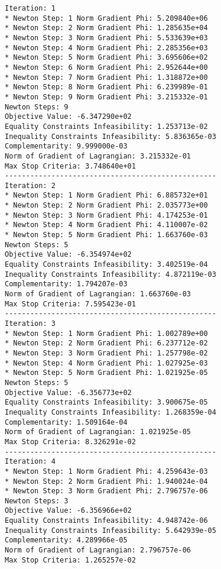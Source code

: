 \documentclass{article}
\begin{document}
\scriptsize
\begin{minipage}[t]{0.45\textwidth}
\begin{verbatim}
Iteration: 1
* Newton Step: 1 Norm Gradient Phi: 5.209840e+06
* Newton Step: 2 Norm Gradient Phi: 1.285635e+04
* Newton Step: 3 Norm Gradient Phi: 5.533639e+03
* Newton Step: 4 Norm Gradient Phi: 2.285356e+03
* Newton Step: 5 Norm Gradient Phi: 3.695606e+02
* Newton Step: 6 Norm Gradient Phi: 2.952644e+00
* Newton Step: 7 Norm Gradient Phi: 1.318872e+00
* Newton Step: 8 Norm Gradient Phi: 6.239989e-01
* Newton Step: 9 Norm Gradient Phi: 3.215332e-01
Newton Steps: 9
Objective Value: -6.347290e+02
Equality Constraints Infeasibility: 1.253713e-02
Inequality Constraints Infeasibility: 5.836365e-03
Complementarity: 9.999000e-03
Norm of Gradient of Lagrangian: 3.215332e-01
Max Stop Criteria: 3.748640e+01
--------------------------------------------------
Iteration: 2
* Newton Step: 1 Norm Gradient Phi: 6.885732e+01
* Newton Step: 2 Norm Gradient Phi: 2.035773e+00
* Newton Step: 3 Norm Gradient Phi: 4.174253e-01
* Newton Step: 4 Norm Gradient Phi: 4.110007e-02
* Newton Step: 5 Norm Gradient Phi: 1.663760e-03
Newton Steps: 5
Objective Value: -6.354974e+02
Equality Constraints Infeasibility: 3.402519e-04
Inequality Constraints Infeasibility: 4.872119e-03
Complementarity: 1.794207e-03
Norm of Gradient of Lagrangian: 1.663760e-03
Max Stop Criteria: 7.595423e-01
--------------------------------------------------
Iteration: 3
* Newton Step: 1 Norm Gradient Phi: 1.002789e+00
* Newton Step: 2 Norm Gradient Phi: 6.237712e-02
* Newton Step: 3 Norm Gradient Phi: 1.257798e-02
* Newton Step: 4 Norm Gradient Phi: 1.027925e-03
* Newton Step: 5 Norm Gradient Phi: 1.021925e-05
Newton Steps: 5
Objective Value: -6.356773e+02
Equality Constraints Infeasibility: 3.900675e-05
Inequality Constraints Infeasibility: 1.268359e-04
Complementarity: 1.509164e-04
Norm of Gradient of Lagrangian: 1.021925e-05
Max Stop Criteria: 8.326291e-02
--------------------------------------------------
Iteration: 4
* Newton Step: 1 Norm Gradient Phi: 4.259643e-03
* Newton Step: 2 Norm Gradient Phi: 1.940024e-04
* Newton Step: 3 Norm Gradient Phi: 2.796757e-06
Newton Steps: 3
Objective Value: -6.356966e+02
Equality Constraints Infeasibility: 4.948742e-06
Inequality Constraints Infeasibility: 5.642939e-05
Complementarity: 4.289966e-05
Norm of Gradient of Lagrangian: 2.796757e-06
Max Stop Criteria: 1.265257e-02
\end{verbatim}
\end{minipage}
\end{document}
